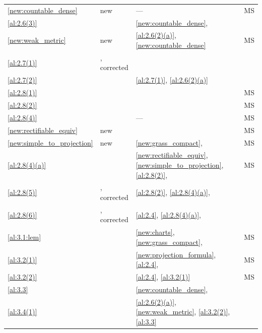 \documentclass[a4paper,twoside,leqno]{article}
\begin{document}
\begin{center}
\begin{longtable}{p{}p{}p{}p{}}
\ref{new:countable_dense} & new & --- & MS \\
\ref{al:2.6(3)} & \cite[2.6(3)]{Allard1972} & \ref{new:countable_dense}, \cite[2.9.19]{Federer1969} &  \\
\ref{new:weak_metric} & new & \ref{al:2.6(2)(a)}, \ref{new:countable_dense} & MS \\
\ref{al:2.7(1)} & \cite[2.7(1)]{Allard1972}, corrected & \cite[2.8.9, 2.8.14]{Federer1969} &  \\
\ref{al:2.7(2)} & \cite[2.7(2)]{Allard1972} & \ref{al:2.7(1)}, \ref{al:2.6(2)(a)} &  \\
\ref{al:2.8(1)} & \cite[2.8(1)--(3)]{Allard1972} & \cite[2.7.16, 2.10.2, 2.10.19, 3.2.16]{Federer1969} & MS \\
\ref{al:2.8(2)} & \cite[2.8(2)]{Allard1972} & \cite[2.2.2, 2.2.3, 2.10.6, 2.10.19]{Federer1969} & MS \\
\ref{al:2.8(4)} & \cite[2.8(4)]{Allard1972} & --- & MS \\
\ref{new:rectifiable_equiv} & new & \cite[3.1.19, 3.2.14, 3.2.29]{Federer1969} & MS \\
\ref{new:simple_to_projection} & new & \ref{new:grass_compact}, \cite[1.6.1]{Federer1969} & MS \\
\ref{al:2.8(4)(a)} & \cite[2.8(4)(a)(b)]{Allard1972} & \ref{new:rectifiable_equiv}, \ref{new:simple_to_projection}, \ref{al:2.8(2)}, \cite[3.2.19, 3.2.25]{Federer1969} & MS \\
\ref{al:2.8(5)} & \cite[2.8(5)]{Allard1972}, corrected & \ref{al:2.8(2)}, \ref{al:2.8(4)(a)}, \cite[2.2.5, 2.8.18, 2.9.2, 2.9.5, 2.9.7, 3.2.14, 3.2.16, 3.3.17]{Federer1969} &  \\
\ref{al:2.8(6)} & \cite[2.8(6)]{Allard1972}, corrected & \ref{al:2.4}, \ref{al:2.8(4)(a)}, \cite[2.10.43, 3.2.14, 3.2.16, 3.2.19, 3.2.20, 3.2.22]{Federer1969} &  \\
\ref{al:3.1:lem} & \cite[3.1]{Allard1972} & \ref{new:charts}, \ref{new:grass_compact}, \cite[2.2.17, 3.1.19]{Federer1969} & MS \\
\ref{al:3.2(1)} & \cite[3.2(1)]{Allard1972} & \ref{new:projection_formula}, \ref{al:2.4}, \cite[2.2.3, 2.3.3, 2.4.7]{Federer1969} & MS \\
\ref{al:3.2(2)} & \cite[3.2(2)]{Allard1972} & \ref{al:2.4}, \ref{al:3.2(1)} & MS \\
\ref{al:3.3} & \cite[3.3]{Allard1972} & \ref{new:countable_dense}, \cite[2.8.18, 2.9.2, 2.9.5--2.9.7]{Federer1969} &  \\
\ref{al:3.4(1)} & \cite[3.4(1)--(3)]{Allard1972} & \ref{al:2.6(2)(a)}, \ref{new:weak_metric}, \ref{al:3.2(2)}, \ref{al:3.3} &  \\

\end{longtable}
\end{center}
\end{document}
